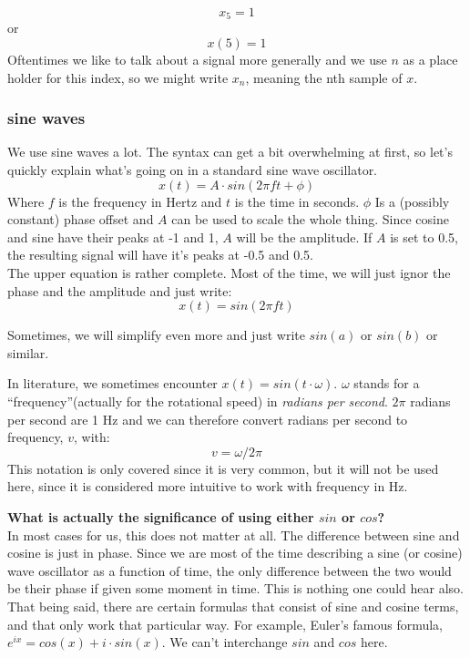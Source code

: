 \begin{equation}
	x_5=1
\end{equation}
or
\begin{equation}
	x(5)=1
\end{equation}
Oftentimes we like to talk about a signal more generally and we use $n$ as a place holder for this index, so we might write $x_n$, meaning the nth sample of $x$.

\subsubsection{sine waves}
We use sine waves a lot. The syntax can get a bit overwhelming at first, so let's quickly explain what's going on in a standard sine wave oscillator.
\begin{equation}
	x(t) = A \cdot sin(2\pi f t + \phi)
\end{equation}
Where $f$ is the frequency in Hertz and $t$ is the time in seconds. $\phi$ Is a (possibly constant) phase offset and $A$ can be used to scale the whole thing. Since cosine and sine have their peaks at -1 and 1, $A$ will be the amplitude. If $A$ is set to 0.5, the resulting signal will have it's peaks at -0.5 and 0.5. \\
The upper equation is rather complete. Most of the time, we will just ignor the phase and the amplitude and just write:
\begin{equation}
	x(t) = sin(2\pi f t )
\end{equation}

Sometimes, we will simplify even more and just write $sin(a)$ or $sin(b)$ or similar.\\
\begin{mdframed}[backgroundcolor=black!10,rightline=false,leftline=false]
In literature, we sometimes encounter $x(t) = sin(t \cdot \omega)$. $\omega$ stands for a ``frequency''(actually for the rotational speed) in \textit{radians per second}. $2\pi$ radians per second are 1 Hz and we can therefore convert radians per second to frequency, $v$, with:
\begin{equation}
  	v = \omega / 2\pi
  \end{equation}
This notation is only covered since it is very common, but it will not be used here, since it is considered more intuitive to work with frequency in Hz.
\vspace{0.5cm}

\textbf{What is actually the significance of using either $sin$ or $cos$?}\\
In most cases for us, this does not matter at all. The difference between sine and cosine is just in phase. Since we are most of the time describing a sine (or cosine) wave oscillator as a function of time, the only difference between the two would be their phase if given some moment in time. This is nothing one could hear also.\\
That being said, there are certain formulas that consist of sine and cosine terms, and that only work that particular way. For example, Euler's famous formula, $e^{ix}=cos(x)+i\cdot sin(x)$. We can't interchange $sin$ and $cos$ here.


\end{mdframed}

